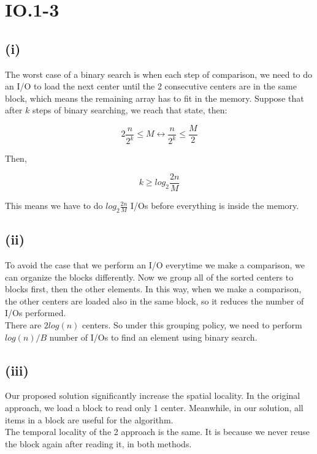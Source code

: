 \section*{IO.1-3}
\subsection*{(i)}
The worst case of a binary search is when each step of comparison, we need to do an I/O to load the next center until the 2 consecutive centers are in the same block, which means the remaining array has to fit in the memory. Suppose that after $k$ steps of binary searching, we reach that state, then:

$$2 \frac{n}{2^k} \leq M \leftrightarrow \frac{n}{2^k} \leq \frac{M}{2}$$

Then,

$$k \geq log_2 \frac{2n}{M} $$

This means we have to do $log_2 \frac{2n}{M}$ I/Os before everything is inside the memory.

\subsection*{(ii)}
To avoid the case that we perform an I/O everytime we make a comparison, we can organize the blocks differently. Now we group all of the sorted centers to blocks first, then the other elements. In this way, when we make a comparison, the other centers are loaded also in the same block, so it reduces the number of I/Os performed.\\

There are $2log(n)$ centers. So under this grouping policy, we need to perform $log(n) / B$ number of I/Os to find an element using binary search.

\subsection*{(iii)}
Our proposed solution significantly increase the spatial locality. In the original approach, we load a block to read only 1 center. Meanwhile, in our solution, all items in a block are useful for the algorithm.\\

The temporal locality of the 2 approach is the same. It is because we never reuse the block again after reading it, in both methods.
